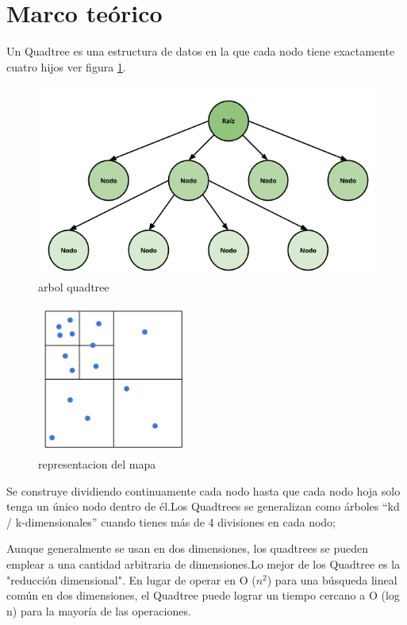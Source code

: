 \section{Marco teórico}


Un Quadtree es una estructura de datos en la que cada nodo tiene exactamente cuatro hijos ver figura \ref{fig:arbol}.


\begin{figure}[H]%
\centering
\includegraphics[width=13cm]{imagenes/tree.png}
\caption{arbol quadtree}
\label{fig:arbol}
\end{figure}



\begin{figure}[H]%
\centering
\includegraphics[width=5cm]{imagenes/cuad.png}
\caption{ representacion del  mapa }
\end{figure}


 Se construye dividiendo continuamente cada nodo hasta que cada nodo hoja solo tenga un único nodo dentro de él.Los Quadtrees se generalizan como árboles “kd / k-dimensionales” cuando tienes más de 4 divisiones en cada nodo;

Aunque generalmente se usan en dos dimensiones, los quadtrees se pueden emplear a una cantidad arbitraria de dimensiones.Lo mejor de los Quadtree es la "reducción dimensional". En lugar de operar en O ($n^2$) para una   búsqueda lineal común  en dos dimensiones, el Quadtree puede lograr un tiempo cercano a O (log n) para la mayoría de las operaciones.

